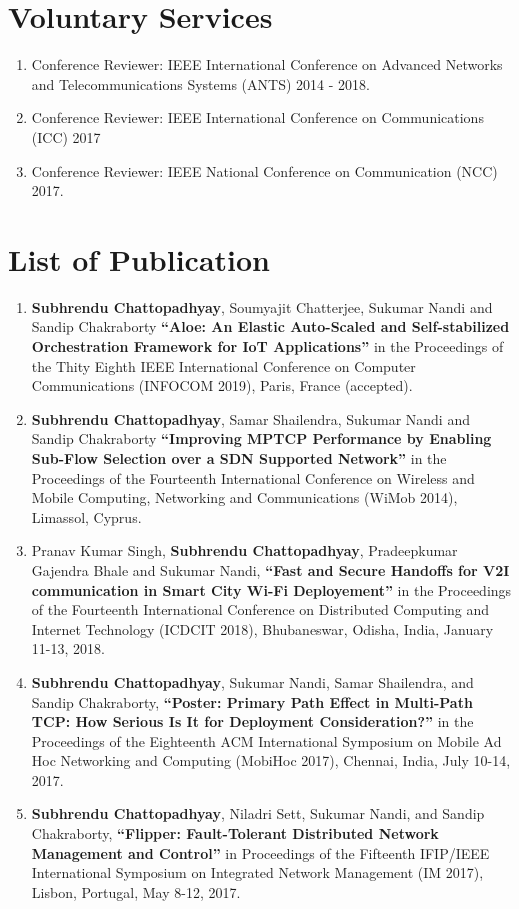 \documentclass{res}
\newcommand{\papertitle}[1]{\textbf{ ``#1''}}
\begin{document}
\begin{resume}
\section{Voluntary Services}
  \begin{enumerate}
   \item Conference Reviewer: IEEE International Conference on Advanced Networks and Telecommunications Systems (ANTS) 2014 - 2018.
   \item Conference Reviewer: IEEE  International Conference on Communications (ICC) 2017
   \item Conference Reviewer: IEEE National Conference on Communication (NCC) 2017.
  \end{enumerate}
\section{List of Publication} 
	\begin{enumerate}
        \item  {\bf Subhrendu Chattopadhyay}, Soumyajit Chatterjee, Sukumar Nandi and Sandip Chakraborty \papertitle{Aloe: An Elastic Auto-Scaled and Self-stabilized Orchestration Framework for IoT Applications} in the Proceedings of the Thity Eighth IEEE International Conference on Computer Communications (INFOCOM 2019), Paris, France (accepted).
        \item {\bf Subhrendu Chattopadhyay}, Samar Shailendra, Sukumar Nandi and Sandip Chakraborty \papertitle{Improving MPTCP Performance by Enabling Sub-Flow Selection over a SDN Supported Network} in the Proceedings of the Fourteenth International Conference on Wireless and Mobile Computing, Networking and Communications (WiMob 2014), Limassol, Cyprus. 
		\item Pranav Kumar Singh, {\bf Subhrendu Chattopadhyay}, Pradeepkumar Gajendra Bhale and Sukumar Nandi, \papertitle{Fast and Secure Handoffs for V2I communication in Smart City Wi-Fi Deployement} in the Proceedings of the Fourteenth International Conference on Distributed Computing and Internet Technology (ICDCIT 2018), Bhubaneswar, Odisha, India, January 11-13, 2018. 
		\item {\bf Subhrendu Chattopadhyay}, Sukumar Nandi, Samar Shailendra, and Sandip Chakraborty,\papertitle{Poster: Primary Path Effect in Multi-Path TCP: How Serious Is It for Deployment Consideration?} in the Proceedings of the Eighteenth ACM International Symposium on Mobile Ad Hoc Networking and Computing (MobiHoc 2017), Chennai, India, July 10-14, 2017. 
		\item {\bf Subhrendu Chattopadhyay}, Niladri Sett, Sukumar Nandi, and Sandip Chakraborty,\papertitle{Flipper: Fault-Tolerant Distributed Network Management and Control} in Proceedings of the Fifteenth IFIP/IEEE International Symposium on Integrated Network Management (IM 2017), Lisbon, Portugal, May 8-12, 2017. 

\end{enumerate}
\end{resume}
\end{document}
